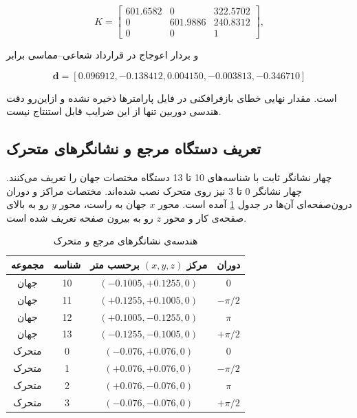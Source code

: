 \begin{equation}
	K=\begin{bmatrix}
	601.6582&0&322.5702\\
	0&601.9886&240.8312\\
	0&0&1
	\end{bmatrix},
	\label{eq:method-camera-matrix}
\end{equation}

و بردار اعوجاج در قرارداد شعاعی--مماسی  برابر

\begin{equation}
	\mathbf d=[0.096912,-0.138412,0.004150,-0.003813,-0.346710]
\end{equation}

است. مقدار نهایی خطای بازفرافکنی در فایل پارامترها ذخیره نشده و ازاین‌رو دقت هندسی دوربین تنها از این ضرایب قابل استنتاج نیست.

\subsection{تعریف دستگاه مرجع و نشانگرهای متحرک}

چهار نشانگر ثابت با شناسه‌های 10 تا 13 دستگاه مختصات جهان را تعریف می‌کنند. چهار نشانگر 0 تا 3 نیز روی متحرک نصب شده‌اند. مختصات مراکز و دوران درون‌صفحه‌ای آن‌ها در جدول \ref{tab:method-tag-layouts} آمده است. محور $x$ جهان به راست، محور $y$ رو به بالای صفحه‌ی کار و محور $z$ رو به بیرون صفحه تعریف شده است.

\begin{table}[htbp]
	\centering
	\scriptsize
	\caption{هندسه‌ی نشانگرهای مرجع و متحرک}
	\label{tab:method-tag-layouts}
	\begin{tabular}{|c|c|c|c|}
		\hline
		\textbf{مجموعه} & \textbf{شناسه} & \textbf{مرکز $(x,y,z)$ برحسب متر} & \textbf{دوران}\\ \hline
		جهان&10&$(-0.1005,+0.1255,0)$&$0$\\
		جهان&11&$(+0.1255,+0.1005,0)$&$-\pi/2$\\
		جهان&12&$(+0.1005,-0.1255,0)$&$\pi$\\
		جهان&13&$(-0.1255,-0.1005,0)$&$+\pi/2$\\ \hline
		متحرک&0&$(-0.076,+0.076,0)$&$0$\\
		متحرک&1&$(+0.076,+0.076,0)$&$-\pi/2$\\
		متحرک&2&$(+0.076,-0.076,0)$&$\pi$\\
		متحرک&3&$(-0.076,-0.076,0)$&$+\pi/2$\\ \hline
	\end{tabular}
\end{table}

